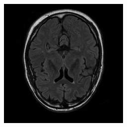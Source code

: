 \documentclass[varwidth=true, border=10pt, convert={size=640x}]{standalone}
\begin{document}
\begin{figure}
\begin{minipage}{.32\textwidth}
  \end{minipage}
  \begin{minipage}{.32\textwidth}
 \includegraphics[width=.99\linewidth]{./images/t2-flair.png}
  \end{minipage}
  

\end{figure}
\end{document}
